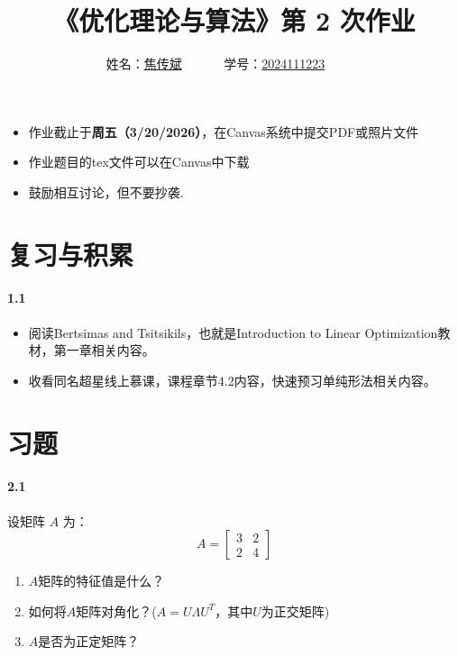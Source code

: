 \documentclass[12pt,a4paper]{article}
\begin{document}
\title{
《优化理论与算法》第 2 次作业
}

\date{}

\author{
姓名：\underline{焦传斌}~~~~~~
学号：\underline{2024111223}~~~~~~}

\maketitle
\maketitle
	\begin{itemize}
\item 作业截止于{\bf 周五（3/20/2026）}，在Canvas系统中提交PDF或照片文件
\item 作业题目的tex文件可以在Canvas中下载
\item 鼓励相互讨论，但不要抄袭.
\end{itemize}
	


\section{复习与积累}
\paragraph{1.1}
\begin{itemize}
\item 阅读Bertsimas and Tsitsikils，也就是Introduction to Linear Optimization教材，第一章相关内容。
\item  收看同名超星线上慕课，课程章节4.2内容，快速预习单纯形法相关内容。
\end{itemize}

\section{习题}


\paragraph{2.1}
设矩阵 $ A $ 为：
\[
A = \begin{bmatrix} 
3 & 2  \\
2 & 4 
\end{bmatrix}
\]

\begin{enumerate}
    \item $A$矩阵的特征值是什么？
    \item 如何将$A$矩阵对角化？($A=U\Lambda U^T$，其中$U$为正交矩阵)
    \item $A$是否为正定矩阵？
\end{enumerate}
\end{document}
